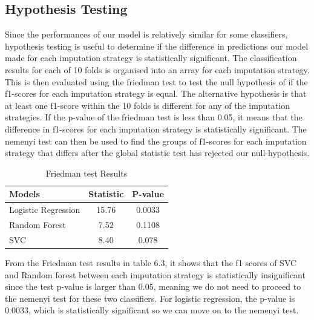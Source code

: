 \documentclass{l4proj}
\begin{document}
\subsection{Hypothesis Testing}

Since the performances of our model is relatively similar for some classifiers, hypothesis testing is useful to determine if the difference in predictions our model made for each imputation strategy is statistically significant. The classification results for each of 10 folds is organised into an array for each imputation strategy. This is then evaluated using the friedman test to test the null hypothesis of if the f1-scores for each imputation strategy is equal. The alternative hypothesis is that at least one f1-score within the 10 folds is different for any of the imputation strategies. If the p-value of the friedman test is less than 0.05, it means that the difference in f1-scores for each imputation strategy is statistically significant. The nemenyi test can then be used to find the groups of f1-scores for each imputation strategy that differs after the global statistic test has rejected our null-hypothesis.

\begin{table}[!htb]
\centering
\caption{Friedman test Results}
\begin{tabular}{lSS}
Models & Statistic & P-value  \\ \midrule 
Logistic Regression & 15.76 & 0.0033 \\ 
Random Forest  & 7.52 & 0.1108\\
SVC &  8.40 & 0.078 \\
\end{tabular}
\end{table}

From the Friedman test results in table 6.3, it shows that the f1 scores of SVC and Random forest between each imputation strategy is statistically insignificant since the test p-value is larger than 0.05, meaning we do not need to proceed to the nemenyi test for these two classifiers. For logistic regression, the p-value is 0.0033, which is statistically significant so we can move on to the nemenyi test.

\begin{table}[!htb]
\centering
\caption{Logistic regression Nemenyi test}
\end{table}
\end{document}
